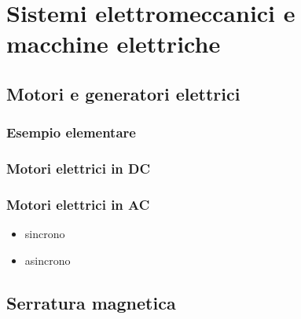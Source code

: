 \documentclass[letterpaper,10pt,italian]{jupyterBook}
\begin{document}
\sphinxstepscope


\section{Sistemi elettromeccanici e macchine elettriche}
\label{\detokenize{ch/electromagnetism/electric-machines:sistemi-elettromeccanici-e-macchine-elettriche}}\label{\detokenize{ch/electromagnetism/electric-machines:physics-hs-electromagnetism-electric-machines}}\label{\detokenize{ch/electromagnetism/electric-machines::doc}}

\subsection{Motori e generatori elettrici}
\label{\detokenize{ch/electromagnetism/electric-machines:motori-e-generatori-elettrici}}

\subsubsection{Esempio elementare}
\label{\detokenize{ch/electromagnetism/electric-machines:esempio-elementare}}

\subsubsection{Motori elettrici in DC}
\label{\detokenize{ch/electromagnetism/electric-machines:motori-elettrici-in-dc}}

\subsubsection{Motori elettrici in AC}
\label{\detokenize{ch/electromagnetism/electric-machines:motori-elettrici-in-ac}}\begin{itemize}
\item {} 
\sphinxAtStartPar
sincrono

\item {} 
\sphinxAtStartPar
asincrono

\end{itemize}


\subsection{Serratura magnetica}
\label{\detokenize{ch/electromagnetism/electric-machines:serratura-magnetica}}
\sphinxstepscope
\end{document}

